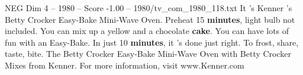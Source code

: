\begin{textsample}{NEG Dim 4 – 1980 – Score -1.00 – 1980/tv\_com\_1980\_118.txt}  \label{ex:f4_neg_040}
It 's Kenner 's Betty Crocker Easy-Bake Mini-Wave Oven.
Preheat 15 \textbf{minutes}, light bulb not included.
You can mix up a yellow and a chocolate \textbf{cake}.
You can have lots of fun with an Easy-Bake.
In just 10 \textbf{minutes}, it 's done just right.
To frost, share, taste, bite.
The Betty Crocker Easy-Bake Mini-Wave Oven with Betty Crocker Mixes from Kenner.
For more information, visit www.Kenner.com

\end{textsample}
